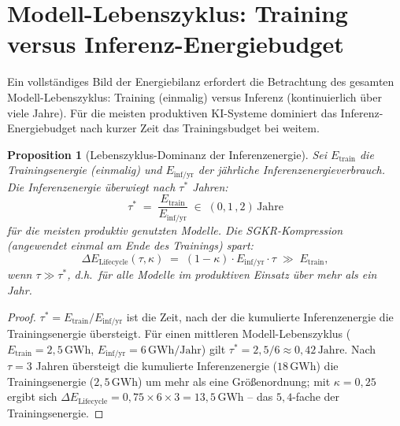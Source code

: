 ﻿\documentclass[12pt, a4paper, openany]{report}
\newtheorem{proposition}[theorem]{Proposition}
\begin{document}
\section{Modell-Lebenszyklus: Training versus Inferenz-Energiebudget}
\label{sec:lifecycle}

Ein vollständiges Bild der Energiebilanz erfordert die Betrachtung des
gesamten Modell-Lebenszyklus: Training (einmalig) versus Inferenz
(kontinuierlich über viele Jahre).  Für die meisten produktiven KI-Systeme
dominiert das Inferenz-Energiebudget nach kurzer Zeit das Trainingsbudget
bei weitem.

\begin{proposition}[Lebenszyklus-Dominanz der Inferenzenergie]
\label{prop:lifecycle}
Sei $E_{\mathrm{train}}$ die Trainingsenergie (einmalig) und
$E_{\mathrm{inf/yr}}$ der jährliche Inferenzenergieverbrauch.
Die Inferenzenergie überwiegt nach $\tau^*$ Jahren:
\begin{equation}
  \label{eq:lifecycle}
  \tau^*
  \;=\;
  \frac{E_{\mathrm{train}}}{E_{\mathrm{inf/yr}}}
  \;\in\; (0{,}1\,, 2)\,\mathrm{Jahre}
\end{equation}
für die meisten produktiv genutzten Modelle.  Die SGKR-Kompression
(angewendet einmal am Ende des Trainings) spart:
\begin{equation}
  \label{eq:lifecycle_savings}
  \Delta E_{\mathrm{Lifecycle}}(\tau, \kappa)
  \;=\;
  (1-\kappa) \cdot E_{\mathrm{inf/yr}} \cdot \tau
  \;\gg\; E_{\mathrm{train}},
\end{equation}
wenn $\tau \gg \tau^*$, d.h.\ für alle Modelle im produktiven Einsatz
über mehr als ein Jahr.
\end{proposition}

\begin{proof}
$\tau^* = E_{\mathrm{train}} / E_{\mathrm{inf/yr}}$ ist die Zeit, nach der
die kumulierte Inferenzenergie die Trainingsenergie übersteigt.
Für einen mittleren Modell-Lebenszyklus ($E_{\mathrm{train}} = 2{,}5\,\mathrm{GWh}$,
$E_{\mathrm{inf/yr}} = 6\,\mathrm{GWh/Jahr}$) gilt
$\tau^* = 2{,}5/6 \approx 0{,}42\,\mathrm{Jahre}$.  Nach $\tau = 3$ Jahren
übersteigt die kumulierte Inferenzenergie ($18\,\mathrm{GWh}$) die
Trainingsenergie ($2{,}5\,\mathrm{GWh}$) um mehr als eine Größenordnung;
mit $\kappa = 0{,}25$ ergibt sich
$\Delta E_{\mathrm{Lifecycle}} = 0{,}75 \times 6 \times 3 = 13{,}5\,\mathrm{GWh}$
-- das $5{,}4$-fache der Trainingsenergie.
\end{proof}
\end{document}
